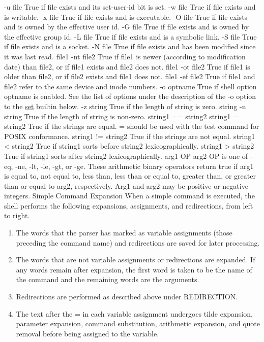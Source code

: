 -u file
True if file exists and its set-user-id bit is set.
-w file
True if file exists and is writable.
-x file
True if file exists and is executable.
-O file
True if file exists and is owned by the effective user id.
-G file
True if file exists and is owned by the effective group id.
-L file
True if file exists and is a symbolic link.
-S file
True if file exists and is a socket.
-N file
True if file exists and has been modified since it was last read.
file1 -nt file2
True if file1 is newer (according to modification date) than file2, or if file1 exists and file2 does not.
file1 -ot file2
True if file1 is older than file2, or if file2 exists and file1 does not.
file1 -ef file2
True if file1 and file2 refer to the same device and inode numbers.
-o optname
True if shell option optname is enabled. See the list of options under the description of the -o option to the \hyperref[sbc:set]{set} builtin below.
-z string
True if the length of string is zero.
string
-n string
True if the length of string is non-zero.
string1 == string2
string1 = string2
True if the strings are equal. = should be used with the test command for POSIX conformance.
string1 != string2
True if the strings are not equal.
string1 < string2
True if string1 sorts before string2 lexicographically.
string1 > string2
True if string1 sorts after string2 lexicographically.
arg1 OP arg2
OP is one of -eq, -ne, -lt, -le, -gt, or -ge. These arithmetic binary operators return true if arg1 is equal to, not equal to, less than, less than or equal to, greater than, or greater than or equal to arg2, respectively. Arg1 and arg2 may be positive or negative integers.
Simple Command Expansion
When a simple command is executed, the shell performs the following expansions, assignments, and redirections, from left to right.

\begin{enumerate}
\item  The words that the parser has marked as variable assignments (those preceding the command name) and redirections are saved for later processing.

\item  The words that are not variable assignments or redirections are expanded. If any words remain after expansion, the first word is taken to be the name of the command and the remaining words are the arguments.

\item  Redirections are performed as described above under REDIRECTION.

\item  The text after the = in each variable assignment undergoes tilde expansion, parameter expansion, command substitution, arithmetic expansion, and quote removal before being assigned to the variable.
\end{enumerate}

